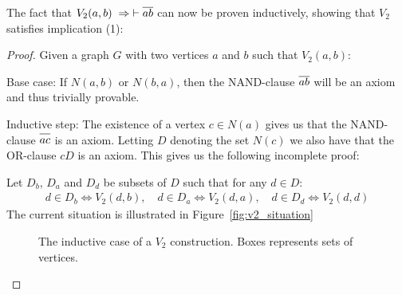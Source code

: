 The fact that $V_2(a,b) \;\Rightarrow\; \vdash \ol{ab}$ can now be proven inductively, showing that $V_2$ satisfies implication (1):
\begin{proof}
  Given a graph $G$ with two vertices $a$ and $b$ such that $V_2(a,b)$:

  Base case:
  If $N(a,b)$ or $N(b,a)$, then the NAND-clause $\ol{ab}$ will be an axiom and thus trivially provable.

  Inductive step:
  The existence of a vertex $c \in N(a)$ gives us that the NAND-clause $\ol{ac}$ is an axiom.
  Letting $D$ denoting the set $N(c)$ we also have that the OR-clause $cD$ is an axiom.
  This gives us the following incomplete proof:\par
  \begin{figure}[!h]
    \centering
    \begin{prooftree*}
      \Hypo{\dots}
    \end{prooftree*}
    \caption{}
    \label{fig:proof_v2_partial}
  \end{figure}
  \FloatBarrier
  Let $D_b$, $D_a$ and $D_d$ be subsets of $D$ such that for any $d \in D$:
  \begin{align}
    d \in D_b \Leftrightarrow V_2(d,b),\quad d \in D_a \Leftrightarrow V_2(d,a),\quad d \in D_d \Leftrightarrow V_2(d,d)
  \end{align}
  The current situation is illustrated in Figure~\ref{fig:v2_situation}\par
  \begin{figure}[!h]
    \centering
    \caption{The inductive case of a $V_2$ construction.
    Boxes represents sets of vertices.
}
\end{figure}
\end{proof}

